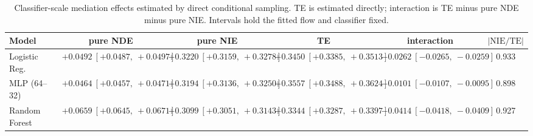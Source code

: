 \begin{table}[htbp]
  \centering
  \caption{Classifier-scale mediation effects estimated by direct conditional sampling. TE is estimated directly; interaction is TE minus pure NDE minus pure NIE. Intervals hold the fitted flow and classifier fixed.}
  \label{tab:german_synth_m2_gap_overall}
  \begin{tabular}{lccccc}
    \toprule
    Model & pure NDE & pure NIE & TE & interaction & $|\mathrm{NIE}/\mathrm{TE}|$ \\
    \midrule
    Logistic Reg. & $+0.0492\ [+0.0487,\ +0.0497]$ & $+0.3220\ [+0.3159,\ +0.3278]$ & $+0.3450\ [+0.3385,\ +0.3513]$ & $-0.0262\ [-0.0265,\ -0.0259]$ & 0.933 \\
    MLP (64--32) & $+0.0464\ [+0.0457,\ +0.0471]$ & $+0.3194\ [+0.3136,\ +0.3250]$ & $+0.3557\ [+0.3488,\ +0.3624]$ & $-0.0101\ [-0.0107,\ -0.0095]$ & 0.898 \\
    Random Forest & $+0.0659\ [+0.0645,\ +0.0671]$ & $+0.3099\ [+0.3051,\ +0.3143]$ & $+0.3344\ [+0.3287,\ +0.3397]$ & $-0.0414\ [-0.0418,\ -0.0409]$ & 0.927 \\
    \bottomrule
  \end{tabular}
\end{table}